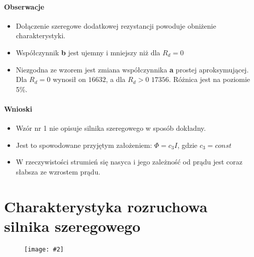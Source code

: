 \documentclass[12pt]{article}
\newcommand{\obrazek}[2]
{
	\begin{figure}[H]
	\centering
	\texttt{[image: \#2]}
	\end{figure}
}
\begin{document}
	\paragraph{Obserwacje}
		\begin{itemize}
			\item Dołączenie szeregowe dodatkowej rezystancji powoduje obniżenie charakterystyki. 
			\item Współczynnik \textbf{b} jest ujemny i mniejszy niż dla $R_d=0$
			\item Niezgodna ze wzorem jest zmiana współczynnika \textbf{a} prostej aproksymującej. Dla $R_d=0$ wynosił on $16632$, a dla $R_d>0$ $17356$. Różnica jest na poziomie 5\%.
		\end{itemize}
	\paragraph{Wnioski}
		\begin{itemize}
			\item Wzór nr 1 nie opisuje silnika szeregowego w sposób dokładny.
			\item Jest to spowodowane przyjętym założeniem: $\Phi = c_3 I$, gdzie $c_3 = const$
			\item W rzeczywistości strumień się nasyca i jego zależność od prądu jest coraz słabsza ze wzrostem prądu.
		\end{itemize}
\section{Charakterystyka rozruchowa silnika szeregowego}

	\obrazek{12}{wykresy/Rozruchowa}
	
\end{document}
